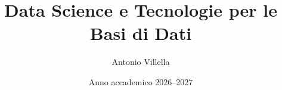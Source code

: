 \title{Data Science e Tecnologie per le Basi di Dati}
\author{Antonio Villella}
\date{Anno accademico 2026--2027}

\maketitle
